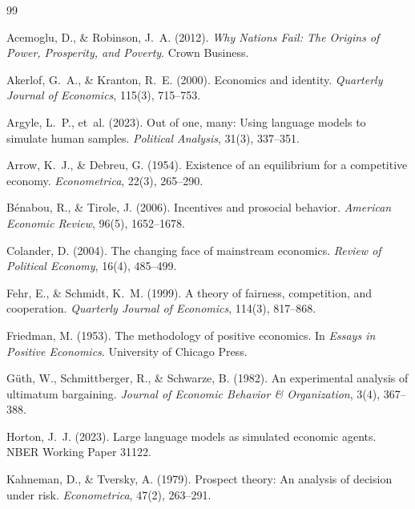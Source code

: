 \documentclass[12pt,a4paper]{article}
\theoremstyle{definition}
\begin{document}
\begin{thebibliography}{99}

Acemoglu, D., \& Robinson, J.~A. (2012).
\newblock \emph{Why Nations Fail: The Origins of Power, Prosperity, and Poverty}.
\newblock Crown Business.

Akerlof, G.~A., \& Kranton, R.~E. (2000).
\newblock Economics and identity.
\newblock \emph{Quarterly Journal of Economics}, 115(3), 715--753.

Argyle, L.~P., et~al. (2023).
\newblock Out of one, many: Using language models to simulate human samples.
\newblock \emph{Political Analysis}, 31(3), 337--351.

Arrow, K.~J., \& Debreu, G. (1954).
\newblock Existence of an equilibrium for a competitive economy.
\newblock \emph{Econometrica}, 22(3), 265--290.

B\'enabou, R., \& Tirole, J. (2006).
\newblock Incentives and prosocial behavior.
\newblock \emph{American Economic Review}, 96(5), 1652--1678.

Colander, D. (2004).
\newblock The changing face of mainstream economics.
\newblock \emph{Review of Political Economy}, 16(4), 485--499.

Fehr, E., \& Schmidt, K.~M. (1999).
\newblock A theory of fairness, competition, and cooperation.
\newblock \emph{Quarterly Journal of Economics}, 114(3), 817--868.

Friedman, M. (1953).
\newblock The methodology of positive economics.
\newblock In \emph{Essays in Positive Economics}. University of Chicago Press.

G\"uth, W., Schmittberger, R., \& Schwarze, B. (1982).
\newblock An experimental analysis of ultimatum bargaining.
\newblock \emph{Journal of Economic Behavior \& Organization}, 3(4), 367--388.

Horton, J.~J. (2023).
\newblock Large language models as simulated economic agents.
\newblock NBER Working Paper 31122.

Kahneman, D., \& Tversky, A. (1979).
\newblock Prospect theory: An analysis of decision under risk.
\newblock \emph{Econometrica}, 47(2), 263--291.


\end{thebibliography}
\end{document}
